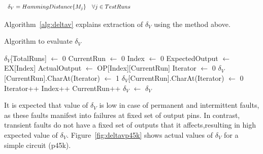 \[
\begin{array}{lp{10cm}} 
\delta_V = HammingDistance \{ M_j \} & \mbox{$\forall j \in TestRuns$}
\end{array} 
\]

Algorithm~\ref{alg:deltav} explains extraction of $\delta_V$ using the method above.

\begin{algorithm}[H]
  \caption{Algorithm to evaluate $\delta_V$}
  \label{alg:deltav}
  \begin{algorithmic}
 \State $\delta_V$[TotalRuns] $\leftarrow$ 0\;
 \State CurrentRun $\leftarrow$ 0\;
  \State Index $\leftarrow$ 0\;
	\State ExpectedOutput $\leftarrow$ EX[Index]\;
	\State ActualOutput $\leftarrow$ OP[Index][CurrentRun]\;
   \State Iterator $\leftarrow$ 0\;
		 \State $\delta_V$[CurrentRun].CharAt(Iterator) $\leftarrow$ 1\;
		\Else
		 \State $\delta_V$[CurrentRun].CharAt(Iterator) $\leftarrow$ 0\;
		\EndIf
		\State Iterator++\;
		\EndWhile
	\State Index++\;
  \EndWhile
 \State CurrentRun++\;
 \EndWhile
 \State $\delta_V$ $\leftarrow$ \;
 \State \Return $\delta_V$\;
 \EndProcedure
 \end{algorithmic}
\end{algorithm}

It is expected that value of $\delta_V$ is low in case of permanent and intermittent faults, as these faults manifest into failures at fixed set of output pins. In contrast, transient faults do not have a fixed set of outputs that it affects,resulting in high expected value of $\delta_V$.  Figure~\ref{fig:deltavp45k} shows actual values of $\delta_V$ for a simple circuit (p45k).

